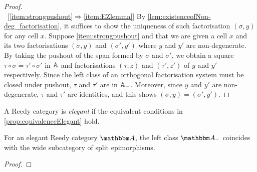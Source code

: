 \documentclass[a4paper,dvipsnames, 11pt]{amsart} %
\begin{document}
\begin{proof}
	\\\ 
	[\ref{item:strongpushout}$\Rightarrow$\ref{item:EZlemma}]
	By \cref{lem:existenceofNon-deg_factorisation},
	it suffices to show the uniqueness of such factorisation $(\sigma,y)$ for any cell $x$.
	Suppose \ref{item:strongpushout} and that we are given a cell $x$ and its two factorisations $(\sigma,y)$ and $(\sigma',y')$ where $y$ and $y'$ are non-degenerate.
	By taking the pushout of the span formed by $\sigma$ and $\sigma'$,
	we obtain a square $\tau\circ\sigma=\tau'\circ\sigma'$ in $\mathbb{A}$ and factorisations
	$(\tau,z)$ and $(\tau',z')$ of $y$ and $y'$ respectively.
	Since the left class of an orthogonal factorisation system must be closed under pushout, $\tau$ and $\tau'$ are in $\mathbb{A}_-$.
	Moreover, since $y$ and $y'$ are non-degenerate, $\tau$ and $\tau'$ are identities, and this shows $(\sigma,y)=(\sigma',y')$.
\end{proof}
\begin{definition}
	A Reedy category is \emph{elegant} if the equivalent conditions in \cref{prop:equivalenceElegant} hold.
\end{definition}
\begin{proposition}
	For an elegant Reedy category $\dgm{A}$, the left class $\dgm{A}_-$ coincides with the wide subcategory of split epimorphisms.
\end{proposition}
\begin{proof}
\end{proof}
\end{document}
